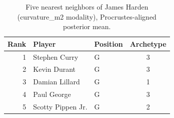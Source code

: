\begin{table}[htbp]
  \centering\small
  \begin{tabular}{rllc}
    \toprule
    Rank & Player & Position & Archetype \\
    \midrule
    1 & Stephen Curry & G & 3 \\
    2 & Kevin Durant & G & 3 \\
    3 & Damian Lillard & G & 1 \\
    4 & Paul George & G & 3 \\
    5 & Scotty Pippen Jr. & G & 2 \\
    \bottomrule
  \end{tabular}
  \caption{Five nearest neighbors of James Harden (curvature_m2 modality), Procrustes-aligned posterior mean.}
  \label{tab:James_Harden_neighbors_curvature_m2}
\end{table}

